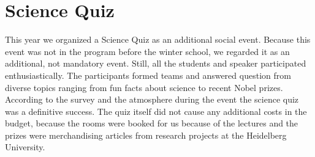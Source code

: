 \section*{Science Quiz}
This year we organized a Science Quiz as an additional social event.
Because this event was not in the program before the winter school, we regarded it as an additional, not mandatory event.
Still, all the students and speaker participated enthusiastically.
The participants formed teams and answered question from diverse topics ranging from fun facts about science to recent Nobel prizes.
According to the survey and the atmosphere during the event the science quiz was a definitive success.
The quiz itself did not cause any additional costs in the budget, because the rooms were booked for us because of the lectures and the prizes were merchandising articles from research projects at the Heidelberg University.